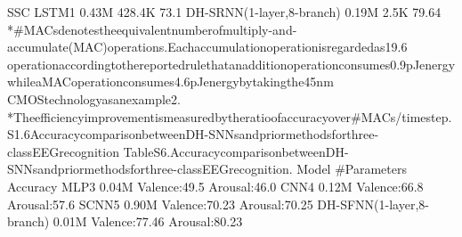  SSC LSTM1 0.43M 428.4K 73.1%
 DH-SRNN(1-layer,8-branch) 0.19M 2.5K 79.64%
 *#MACsdenotestheequivalentnumberofmultiply-and-accumulate(MAC)operations.Eachaccumulationoperationisregardedas19.6%
 operationaccordingtothereportedrulethatanadditionoperationconsumes0.9pJenergywhileaMACoperationconsumes4.6pJenergybytakingthe45nm
 CMOStechnologyasanexample2.
 *Theefficiencyimprovementismeasuredbytheratioofaccuracyover#MACs/timestep.
 S1.6AccuracycomparisonbetweenDH-SNNsandpriormethodsforthree-classEEGrecognition
 TableS6.AccuracycomparisonbetweenDH-SNNsandpriormethodsforthree-classEEGrecognition.
 Model #Parameters Accuracy
 MLP3
 0.04M Valence:49.5%
 Arousal:46.0%
 CNN4
 0.12M Valence:66.8%
 Arousal:57.6%
 SCNN5
 0.90M Valence:70.23%
 Arousal:70.25%
 DH-SFNN(1-layer,8-branch) 0.01M Valence:77.46%
 Arousal:80.23%



 